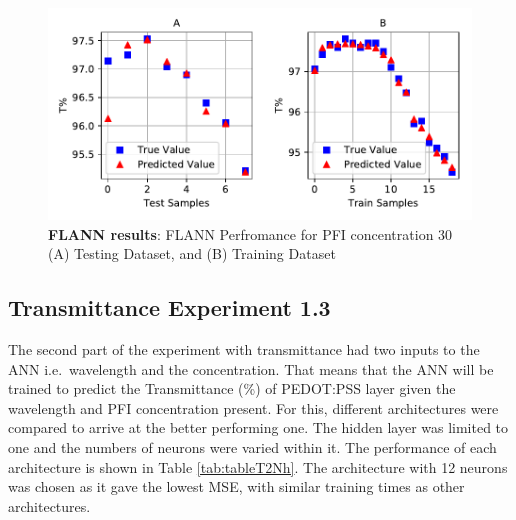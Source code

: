 \documentclass[]{article}
\begin{document}
\begin{figure}
\centering
\includegraphics{Report_files/figure-latex/transmitflannplot30-1.pdf}
\caption{\label{fig:transmitflannplot30}\textbf{FLANN results}: FLANN Perfromance for PFI concentration 30 (A) Testing Dataset, and (B) Training Dataset}
\end{figure}

\newpage

\hypertarget{transmittance-experiment-1.3}{%
\subsection{Transmittance Experiment 1.3}\label{transmittance-experiment-1.3}}

The second part of the experiment with transmittance had two inputs to the ANN i.e.~wavelength and the concentration. That means that the ANN will be trained to predict the Transmittance (\%) of PEDOT:PSS layer given the wavelength and PFI concentration present. For this, different architectures were compared to arrive at the better performing one. The hidden layer was limited to one and the numbers of neurons were varied within it. The performance of each architecture is shown in Table \ref{tab:tableT2Nh}. The architecture with 12 neurons was chosen as it gave the lowest MSE, with similar training times as other architectures.
\end{document}
